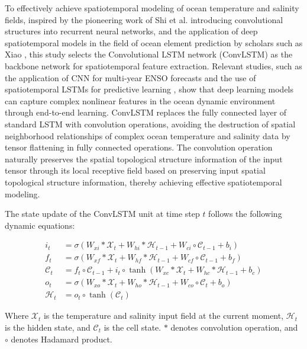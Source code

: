 \documentclass[webpdf,contemporary,large]{oup-authoring-template}
\begin{document}
To effectively achieve spatiotemporal modeling of ocean temperature and salinity fields, inspired by the pioneering work of Shi et al. \cite{shiConvolutionalLSTMNetwork2015} introducing convolutional structures into recurrent neural networks, and the application of deep spatiotemporal models in the field of ocean element prediction by scholars such as Xiao \cite{xiaoSpatiotemporalDeepLearning2019}, this study selects the Convolutional LSTM network (ConvLSTM) as the backbone network for spatiotemporal feature extraction. Relevant studies, such as the application of CNN for multi-year ENSO forecasts \cite{hamDeepLearningMultiyear2019} and the use of spatiotemporal LSTMs for predictive learning \cite{wangPredRNNRecurrentNeural2017}, show that deep learning models can capture complex nonlinear features in the ocean dynamic environment through end-to-end learning. ConvLSTM replaces the fully connected layer of standard LSTM with convolution operations, avoiding the destruction of spatial neighborhood relationships of complex ocean temperature and salinity data by tensor flattening in fully connected operations. The convolution operation naturally preserves the spatial topological structure information of the input tensor through its local receptive field based on preserving input spatial topological structure information, thereby achieving effective spatiotemporal modeling.

The state update of the ConvLSTM unit at time step $t$ follows the following dynamic equations:

\begin{equation}
\begin{aligned} i_t &= \sigma(W_{xi} * \mathcal{X}_t + W_{hi} * \mathcal{H}_{t-1} + W_{ci} \circ \mathcal{C}_{t-1} + b_i) \\ f_t &= \sigma(W_{xf} * \mathcal{X}_t + W_{hf} * \mathcal{H}_{t-1} + W_{cf} \circ \mathcal{C}_{t-1} + b_f) \\ \mathcal{C}_t &= f_t \circ \mathcal{C}_{t-1} + i_t \circ \tanh(W_{xc} * \mathcal{X}_t + W_{hc} * \mathcal{H}_{t-1} + b_c) \\ o_t &= \sigma(W_{xo} * \mathcal{X}_t + W_{ho} * \mathcal{H}_{t-1} + W_{co} \circ \mathcal{C}_t + b_o) \\ \mathcal{H}_t &= o_t \circ \tanh(\mathcal{C}_t) \end{aligned}
\end{equation}

Where $\mathcal{X}_t$ is the temperature and salinity input field at the current moment, $\mathcal{H}_t$ is the hidden state, and $\mathcal{C}_t$ is the cell state. $*$ denotes convolution operation, and $\circ$ denotes Hadamard product.
\end{document}
